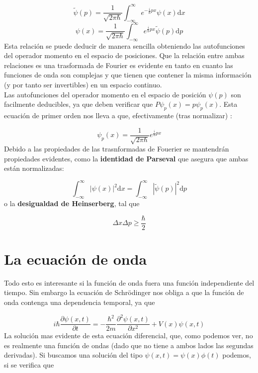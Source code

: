 \documentclass[12pt,a4paper]{book}
\numberwithin{equation}{chapter}
\numberwithin{figure}{chapter}
\newcommand{\parciales}[2]{\frac{\partial #1}{\partial #2}}
\newcommand{\D}{\mathrm{d}}
\newcommand{\intinf}{\int_{-\infty}^{\infty}}
\begin{document}
\begin{equation}
\tilde{\psi} (p) = \frac{1}{\sqrt{2 \pi \hbar}} \intinf e^{-\frac{i}{\hbar} p x}  \psi  (x)  \D x
\end{equation}
\begin{equation}
{\psi} (x) = \frac{1}{\sqrt{2 \pi \hbar}} \intinf e^{\frac{i}{\hbar} p x}  \tilde{\psi}  (p)  \D p
\end{equation}
Esta relación se puede deducir de manera sencilla obteniendo las autofunciones del operador momento en el espacio de posiciones. Que la relación entre ambas relaciones es una trasformada de Fourier es evidente en tanto en cuanto las funciones de onda son complejas y que tienen que contener la misma información (y por tanto ser invertibles) en un espacio continuo. \\

Las autofunciones del operador momento en el espacio de posición  $\psi(p)$ son facilmente deducibles, ya que deben verificar que $P \psi_p(x)=p \psi_p (x)$. Esta ecuación de primer orden nos lleva a que, efectivamente (tras normalizar) :

\begin{equation}
\psi_p(x)=\frac{1}{\sqrt{2\pi \hbar}} e^{\frac{i}{\hbar} px}
\end{equation}
Debido a las propiedades de las trasnformadas de Fouerier se mantendrán propiedades evidentes, como la \textbf{identidad de Parseval} que asegura que ambas están normalizadas:

\begin{equation}
\intinf |\psi(x)|^2 \D x = \intinf |\tilde{\psi} (p) |^2 \D p
\end{equation}
o la \textbf{desigualdad de Heinserberg}, tal que

\begin{equation}
\Delta x \Delta p \geq \frac{\hbar}{2}
\end{equation}

\section{La ecuación de onda}

Todo esto es interesante si la función de onda fuera una función independiente del tiempo. Sin embargo la ecuación de Schrödinger nos obliga a que la función de onda contenga una dependencia temporal, ya que

\begin{equation}
i \hbar \parciales{\psi (x,t)}{t} = -\frac{\hbar^2}{2m} \parciales{^2\psi (x,t)}{x^2} + V(x) \psi (x,t)
\end{equation}
La solución mas evidente de esta ecuación diferencial, que, como podemos ver, no es realmente una función de ondas (dado que no tiene a ambos lados las segundas derivadas). Si buscamos una solución del tipo $\psi(x,t) = \psi(x) \phi (t)$ podemos, si se verifica que
\end{document}

